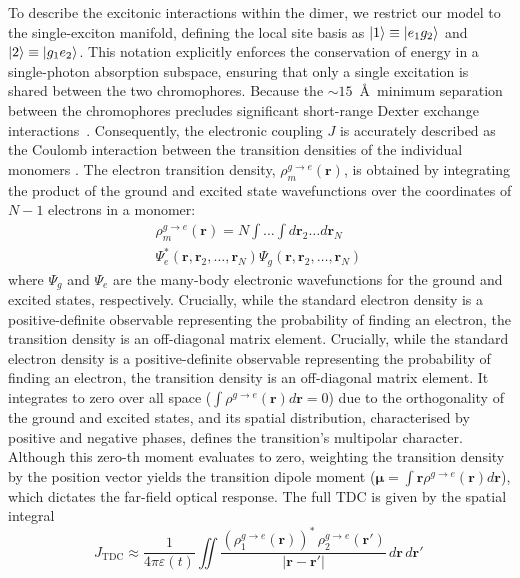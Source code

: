 \documentclass[journal=jpclcd, manuscript=letter, layout=twocolumn, doi=true]{achemso}
\begin{document}
To describe the excitonic interactions within the dimer, we restrict our model to the single-exciton manifold, defining the local site basis as $\ket{1}\equiv\ket{e_1 g_2}$ and $\ket{2}\equiv\ket{g_1 e_2}$. This notation explicitly enforces the conservation of energy in a single-photon absorption subspace, ensuring that only a single excitation is shared between the two chromophores. Because the $\sim 15$~\AA\ minimum separation between the chromophores precludes significant short-range Dexter exchange interactions~\cite{skourtis2016dexter}. Consequently, the electronic coupling $J$ is accurately described as the Coulomb interaction between the transition densities of the individual monomers \cite{hsu2009}. The electron transition density, $\rho^{g\to e}_m(\mathbf r)$, is obtained by integrating the product of the ground and excited state wavefunctions over the coordinates of $N-1$ electrons in a monomer:
\begin{multline} \label{eq:transition_density}
    \rho^{g\to e}_m(\mathbf{r}) =  
    N \int \dots \int d\mathbf{r}_2 \dots d\mathbf{r}_N \\ \Psi_e^*(\mathbf{r}, \mathbf{r}_2, \dots, \mathbf{r}_N) \Psi_g(\mathbf{r}, \mathbf{r}_2, \dots, \mathbf{r}_N) \,
\end{multline}
where $\Psi_g$ and $\Psi_e$ are the many-body electronic wavefunctions for the ground and excited states, respectively. Crucially, while the standard electron density is a positive-definite observable representing the probability of finding an electron, the transition density is an off-diagonal matrix element.
Crucially, while the standard electron density is a positive-definite observable representing the probability of finding an electron, the transition density is an off-diagonal matrix element. It integrates to zero over all space ($\int \rho^{g\to e}(\mathbf{r}) d\mathbf{r} = 0$) due to the orthogonality of the ground and excited states, and its spatial distribution, characterised by positive and negative phases, defines the transition's multipolar character. Although this zero-th moment evaluates to zero, weighting the transition density by the position vector yields the transition dipole moment ($\boldsymbol{\mu} = \int \mathbf{r} \rho^{g \to e}(\mathbf{r}) d\mathbf{r}$), which dictates the far-field optical response. The full TDC is given by the spatial integral
\begin{equation}
    J_{\mathrm{TDC}} \approx \frac{1}{4\pi\varepsilon(t)}\iint \frac{\left(\rho^{g\to e}_1(\mathbf r)\right)^*\,\rho^{g\to e}_2(\mathbf r')}{|\mathbf r-\mathbf r'|} \,d\mathbf r\,d\mathbf r' \,
    \label{eq:J_integral}
\end{equation}
\end{document}
